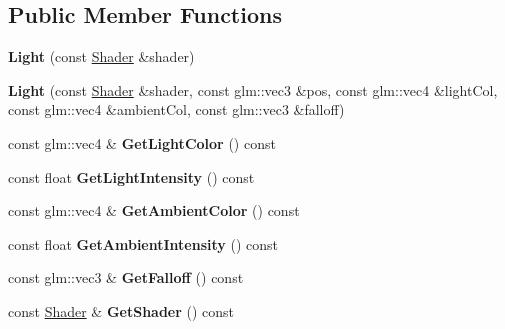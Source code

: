 \subsection*{Public Member Functions}
\begin{DoxyCompactItemize}
\item 
\hypertarget{class_z_e_g_l_1_1_light_afd825de339b3628b68ba5e6f7114bf8c}{}{\bfseries Light} (const \hyperlink{class_z_e_g_l_1_1_shader}{Shader} \&shader)\label{class_z_e_g_l_1_1_light_afd825de339b3628b68ba5e6f7114bf8c}

\item 
\hypertarget{class_z_e_g_l_1_1_light_a08a2c7c4151a9bfebe9cd55c3ccbfb90}{}{\bfseries Light} (const \hyperlink{class_z_e_g_l_1_1_shader}{Shader} \&shader, const glm\+::vec3 \&pos, const glm\+::vec4 \&light\+Col, const glm\+::vec4 \&ambient\+Col, const glm\+::vec3 \&falloff)\label{class_z_e_g_l_1_1_light_a08a2c7c4151a9bfebe9cd55c3ccbfb90}

\item 
\hypertarget{class_z_e_g_l_1_1_light_a03baeda2201dc186e7cbd244b75112f3}{}const glm\+::vec4 \& {\bfseries Get\+Light\+Color} () const \label{class_z_e_g_l_1_1_light_a03baeda2201dc186e7cbd244b75112f3}

\item 
\hypertarget{class_z_e_g_l_1_1_light_a1f30c12e1eae0c76139bd656ec7a9b54}{}const float {\bfseries Get\+Light\+Intensity} () const \label{class_z_e_g_l_1_1_light_a1f30c12e1eae0c76139bd656ec7a9b54}

\item 
\hypertarget{class_z_e_g_l_1_1_light_a05177b39933c5b4f337b7559f4411697}{}const glm\+::vec4 \& {\bfseries Get\+Ambient\+Color} () const \label{class_z_e_g_l_1_1_light_a05177b39933c5b4f337b7559f4411697}

\item 
\hypertarget{class_z_e_g_l_1_1_light_a8c2c35f9689b6775f167602b7f15d10b}{}const float {\bfseries Get\+Ambient\+Intensity} () const \label{class_z_e_g_l_1_1_light_a8c2c35f9689b6775f167602b7f15d10b}

\item 
\hypertarget{class_z_e_g_l_1_1_light_a7372ec650910810a8048f05834f51ad4}{}const glm\+::vec3 \& {\bfseries Get\+Falloff} () const \label{class_z_e_g_l_1_1_light_a7372ec650910810a8048f05834f51ad4}

\item 
\hypertarget{class_z_e_g_l_1_1_light_a1cc86994bbac07d8ddfea58269414f82}{}const \hyperlink{class_z_e_g_l_1_1_shader}{Shader} \& {\bfseries Get\+Shader} () const \label{class_z_e_g_l_1_1_light_a1cc86994bbac07d8ddfea58269414f82}


\end{DoxyCompactItemize}
